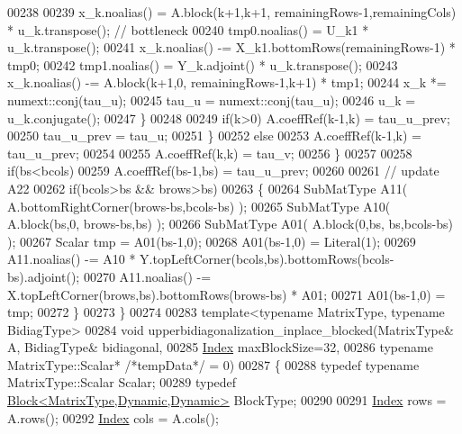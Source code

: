 \begin{DoxyCode}
00238                     
00239         x\_k.noalias()   = A.block(k+1,k+1, remainingRows-1,remainingCols) * u\_k.transpose(); \textcolor{comment}{// bottleneck}
00240         tmp0.noalias()  = U\_k1 * u\_k.transpose();
00241         x\_k.noalias()  -= X\_k1.bottomRows(remainingRows-1) * tmp0;
00242         tmp1.noalias()  = Y\_k.adjoint() * u\_k.transpose();
00243         x\_k.noalias()  -= A.block(k+1,0, remainingRows-1,k+1) * tmp1;
00244         x\_k *= numext::conj(tau\_u);
00245         tau\_u = numext::conj(tau\_u);
00246         u\_k = u\_k.conjugate();
00247       \}
00248 
00249       \textcolor{keywordflow}{if}(k>0) A.coeffRef(k-1,k) = tau\_u\_prev;
00250       tau\_u\_prev = tau\_u;
00251     \}
00252     \textcolor{keywordflow}{else}
00253       A.coeffRef(k-1,k) = tau\_u\_prev;
00254 
00255     A.coeffRef(k,k) = tau\_v;
00256   \}
00257   
00258   \textcolor{keywordflow}{if}(bs<bcols)
00259     A.coeffRef(bs-1,bs) = tau\_u\_prev;
00260 
00261   \textcolor{comment}{// update A22}
00262   \textcolor{keywordflow}{if}(bcols>bs && brows>bs)
00263   \{
00264     SubMatType A11( A.bottomRightCorner(brows-bs,bcols-bs) );
00265     SubMatType A10( A.block(bs,0, brows-bs,bs) );
00266     SubMatType A01( A.block(0,bs, bs,bcols-bs) );
00267     Scalar tmp = A01(bs-1,0);
00268     A01(bs-1,0) = Literal(1);
00269     A11.noalias() -= A10 * Y.topLeftCorner(bcols,bs).bottomRows(bcols-bs).adjoint();
00270     A11.noalias() -= X.topLeftCorner(brows,bs).bottomRows(brows-bs) * A01;
00271     A01(bs-1,0) = tmp;
00272   \}
00273 \}
00274 
00283 \textcolor{keyword}{template}<\textcolor{keyword}{typename} MatrixType, \textcolor{keyword}{typename} B\textcolor{keywordtype}{id}iagType>
00284 \textcolor{keywordtype}{void} upperbidiagonalization\_inplace\_blocked(MatrixType& A, BidiagType& bidiagonal,
00285                                             \hyperlink{class_eigen_1_1internal_1_1_upper_bidiagonalization_adcb14f3919a3dcc9977ba6b8105087fe}{Index} maxBlockSize=32,
00286                                             \textcolor{keyword}{typename} MatrixType::Scalar* \textcolor{comment}{/*tempData*/} = 0)
00287 \{
00288   \textcolor{keyword}{typedef} \textcolor{keyword}{typename} MatrixType::Scalar Scalar;
00289   \textcolor{keyword}{typedef} \hyperlink{group___core___module_class_eigen_1_1_block}{Block<MatrixType,Dynamic,Dynamic>} BlockType;
00290 
00291   \hyperlink{class_eigen_1_1internal_1_1_upper_bidiagonalization_adcb14f3919a3dcc9977ba6b8105087fe}{Index} rows = A.rows();
00292   \hyperlink{class_eigen_1_1internal_1_1_upper_bidiagonalization_adcb14f3919a3dcc9977ba6b8105087fe}{Index} cols = A.cols();

\end{DoxyCode}
